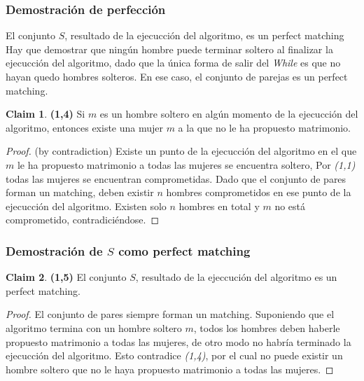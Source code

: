 \documentclass[12pt, fleqn]{article}
\theoremstyle{remark}
\theoremstyle{definition}
\newtheorem*{definition}{Claim}
\begin{document}
\subsubsection{Demostración de perfección}
    El conjunto $S$, resultado de la ejecucción del algoritmo, es un perfect matching
    Hay que demostrar que ningún hombre puede terminar soltero al finalizar la ejecucción
    del algoritmo, dado que la única forma de salir del \emph{While} es que no hayan
    quedo hombres solteros. En ese caso, el conjunto de parejas es un perfect matching.
\begin{definition}
    \textbf{(1,4)} Si $m$ es un hombre soltero en algún momento de la ejecucción del algoritmo,
    entonces existe una mujer $m$ a la que no le ha propuesto matrimonio.
\begin{proof}
    (by contradiction) Existe un punto de la ejecucción del algoritmo en el que
    $m$ le ha propuesto matrimonio a todas las mujeres se encuentra soltero, 
    Por \emph{(1,1)} todas las mujeres se encuentran comprometidas. Dado que el conjunto de 
    pares forman un matching, deben existir $n$ hombres comprometidos en ese punto
    de la ejecucción del algoritmo. Existen solo $n$ hombres en total y $m$ no está
    comprometido, contradiciéndose.
\end{proof}
\end{definition}
\subsubsection{Demostración de $S$ como perfect matching}

\begin{definition}
    \textbf{(1,5)} El conjunto $S$, resultado de la ejeccución del algoritmo
    es un perfect matching.
\end{definition}
\begin{proof}
    El conjunto de pares siempre forman un matching. Suponiendo que el algoritmo termina
    con un hombre soltero $m$, todos los hombres deben haberle propuesto matrimonio
    a todas las mujeres, de otro modo no habría terminado la ejecucción del algoritmo.
    Esto contradice \emph{(1,4)}, por el cual no puede existir un hombre soltero que no 
    le haya propuesto matrimonio a todas las mujeres.
\end{proof}
\end{document}
